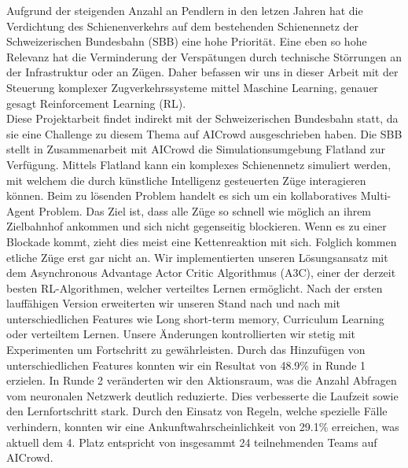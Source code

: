 Aufgrund der steigenden Anzahl an Pendlern in den letzen Jahren hat die Verdichtung des Schienenverkehrs auf dem bestehenden Schienennetz der Schweizerischen Bundesbahn (SBB) eine hohe Priorität.
Eine eben so hohe Relevanz hat die Verminderung der Verspätungen durch technische Störrungen an der Infrastruktur oder an Zügen.
Daher befassen wir uns in dieser Arbeit mit der Steuerung komplexer Zugverkehrssysteme mittel Maschine Learning, genauer gesagt Reinforcement Learning (RL).\\
Diese Projektarbeit findet indirekt mit der Schweizerischen Bundesbahn statt, da sie eine Challenge zu diesem Thema auf AICrowd ausgeschrieben haben.
Die SBB stellt in Zusammenarbeit mit AICrowd die Simulationsumgebung Flatland zur Verfügung. Mittels Flatland kann ein komplexes Schienennetz simuliert werden, mit welchem die durch künstliche Intelligenz gesteuerten Züge interagieren können.
Beim zu lösenden Problem handelt es sich um ein kollaboratives Multi-Agent Problem. Das Ziel ist, dass alle Züge so schnell wie möglich an ihrem Zielbahnhof ankommen und sich nicht gegenseitig blockieren. Wenn es zu einer Blockade kommt, zieht dies meist eine Kettenreaktion mit sich. Folglich kommen etliche Züge erst gar nicht an.
Wir implementierten unseren Lösungsansatz mit dem Asynchronous Advantage Actor Critic Algorithmus (A3C), einer der derzeit besten RL-Algorithmen, welcher verteiltes Lernen ermöglicht.
Nach der ersten lauffähigen Version erweiterten wir unseren Stand nach und nach mit unterschiedlichen Features wie Long short-term memory, Curriculum Learning oder verteiltem Lernen.
Unsere Änderungen kontrollierten wir stetig mit Experimenten um Fortschritt zu gewährleisten.
Durch das Hinzufügen von unterschiedlichen Features konnten wir ein Resultat von 48.9\% in Runde 1 erzielen.
In Runde 2 veränderten wir den Aktionsraum, was die Anzahl Abfragen vom neuronalen Netzwerk deutlich reduzierte. Dies verbesserte die Laufzeit sowie den Lernfortschritt stark.
Durch den Einsatz von Regeln, welche spezielle Fälle verhindern, konnten wir eine Ankunftwahrscheinlichkeit von 29.1\% erreichen, was aktuell dem 4. Platz entspricht von insgesammt 24 teilnehmenden Teams auf AICrowd.
\newpage
\thispagestyle{empty}
